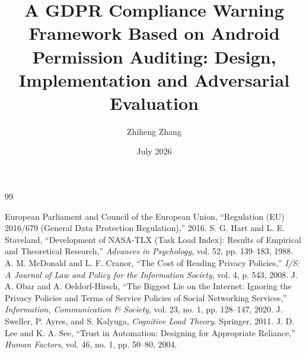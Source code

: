 \documentclass{article}
\title{A GDPR Compliance Warning Framework Based on Android Permission Auditing: Design, Implementation and Adversarial Evaluation}
\author{Zhiheng Zhang}
\date{July 2026}
\begin{document}
\maketitle
\newpage
\tableofcontents
\newpage










\begin{thebibliography}{99}

 European Parliament and Council of the European Union, ``Regulation (EU) 2016/679 (General Data Protection Regulation),'' 2016.
 S. G. Hart and L. E. Staveland, ``Development of NASA-TLX (Task Load Index): Results of Empirical and Theoretical Research,'' \emph{Advances in Psychology}, vol. 52, pp. 139--183, 1988.
 A. M. McDonald and L. F. Cranor, ``The Cost of Reading Privacy Policies,'' \emph{I/S: A Journal of Law and Policy for the Information Society}, vol. 4, p. 543, 2008.
 J. A. Obar and A. Oeldorf-Hirsch, ``The Biggest Lie on the Internet: Ignoring the Privacy Policies and Terms of Service Policies of Social Networking Services,'' \emph{Information, Communication \& Society}, vol. 23, no. 1, pp. 128--147, 2020.
 J. Sweller, P. Ayres, and S. Kalyuga, \emph{Cognitive Load Theory}. Springer, 2011.
 J. D. Lee and K. A. See, ``Trust in Automation: Designing for Appropriate Reliance,'' \emph{Human Factors}, vol. 46, no. 1, pp. 50--80, 2004.

\end{thebibliography}
\end{document}
